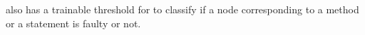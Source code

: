 {\tool} also has a trainable threshold for  to classify
if a node corresponding to a method or a statement is faulty or not.


